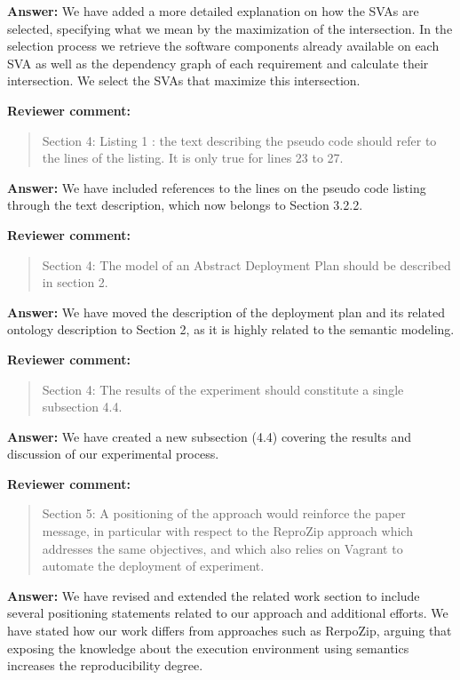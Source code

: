 \documentclass{letter}
\newenvironment{review}%
{\textbf{Reviewer comment:}\begin{quote}}%
{\end{quote}}%
\newcommand{\answer}[1]{%
      \textbf{Answer:} #1}
\begin{document}
\begin{letter}{}
\answer{We have added a more detailed explanation on how the SVAs are selected, specifying what we mean by the maximization of the intersection. In the selection process we retrieve the software components already available on each SVA as well as the dependency graph of each requirement and calculate their intersection. We select the SVAs that maximize this intersection.}


\begin{review}
Section 4: Listing 1 : the text describing the pseudo code should refer to the lines of the listing. It is only true for lines 23 to 27.
\end{review}

\answer{We have included references to the lines on the pseudo code listing through the text description, which now belongs to Section 3.2.2.}


\begin{review}
Section 4: The model of an Abstract Deployment Plan should be described in section 2.
\end{review}

\answer{We have moved the description of the deployment plan and its related ontology description to Section 2, as it is highly related to the semantic modeling.}


\begin{review}
Section 4: The results of the experiment should constitute a single subsection 4.4.
\end{review}

\answer{We have created a new subsection (4.4) covering the results and discussion of our experimental process.}


\begin{review}
Section 5: A positioning of the approach would reinforce the paper message, in particular with respect to the ReproZip approach which addresses the same objectives, and which also relies on Vagrant to automate the deployment of experiment.
\end{review}

\answer{We have revised and extended the related work section to include several positioning statements related to our approach and additional efforts. We have stated how our work differs from approaches such as RerpoZip, arguing that exposing the knowledge about the execution environment using semantics increases the reproducibility degree.}



\end{letter}
\end{document}
